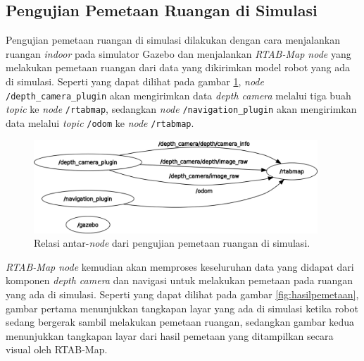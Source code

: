 \subsection{Pengujian Pemetaan Ruangan di Simulasi}
\label{subsec:slamsimulasi}

Pengujian pemetaan ruangan di simulasi dilakukan dengan cara menjalankan ruangan \emph{indoor} pada simulator Gazebo dan menjalankan \emph{RTAB-Map node} yang melakukan pemetaan ruangan dari data yang dikirimkan model robot yang ada di simulasi.
Seperti yang dapat dilihat pada gambar \ref{fig:rosgraphslamsimulation},
  \emph{node} \lstinline{/depth_camera_plugin} akan mengirimkan data \emph{depth camera} melalui tiga buah \emph{topic} ke \emph{node} \lstinline{/rtabmap},
  sedangkan \emph{node} \lstinline{/navigation_plugin} akan mengirimkan data melalui \emph{topic} \lstinline{/odom} ke \emph{node} \lstinline{/rtabmap}.

\begin{figure}[ht]
  \centering
  \includegraphics[width=0.95\textwidth,keepaspectratio]{gambar/rosgraph-slam-simulation.png}
  \caption{Relasi antar-\emph{node} dari pengujian pemetaan ruangan di simulasi.}
  \label{fig:rosgraphslamsimulation}
\end{figure}

\emph{RTAB-Map node} kemudian akan memproses keseluruhan data yang didapat dari komponen \emph{depth camera} dan navigasi untuk melakukan pemetaan pada ruangan yang ada di simulasi.
Seperti yang dapat dilihat pada gambar \ref{fig:hasilpemetaan},
  gambar pertama menunjukkan tangkapan layar yang ada di simulasi ketika robot sedang bergerak sambil melakukan pemetaan ruangan,
  sedangkan gambar kedua menunjukkan tangkapan layar dari hasil pemetaan yang ditampilkan secara visual oleh RTAB-Map.

